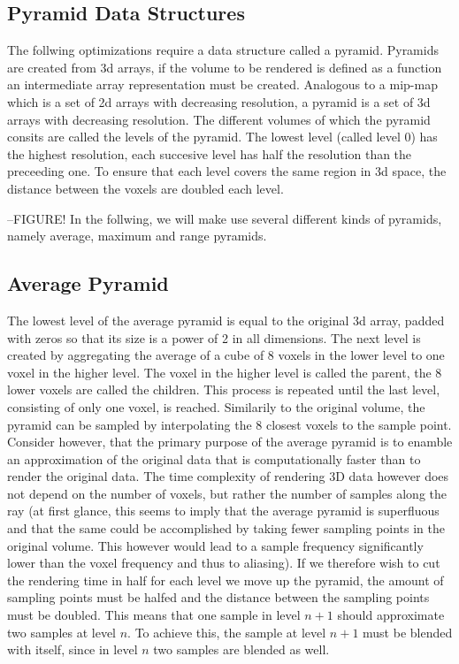 {\subsection{Pyramid Data Structures}
The follwing optimizations require a data structure called a pyramid. Pyramids are created from 3d arrays, if the volume to be rendered is defined as a function an intermediate array representation must be created.
Analogous to a mip-map which is a set of 2d arrays with decreasing resolution, a pyramid is a set of 3d arrays with decreasing resolution. The different volumes of which the pyramid consits are called the levels of the pyramid. The lowest level (called level 0) has the highest resolution, each succesive level has half the resolution than the preceeding one. To ensure that each level covers the same region in 3d space, the distance between the voxels are doubled each level.

--FIGURE!
In the follwing, we will make use several different kinds of pyramids, namely average, maximum and range pyramids.
\subsection{Average Pyramid}
The lowest level of the average pyramid is equal to the original 3d array, padded with zeros so that its size is a power of 2 in all dimensions.
The next level is created by aggregating the average of a cube of 8 voxels in the lower level to one voxel in the higher level. The voxel in the higher level is called the parent, the 8 lower voxels are called the children. This process is repeated until the last level, consisting of only one voxel, is reached. 
Similarily to the original volume, the pyramid can be sampled by interpolating the 8 closest voxels to the sample point. Consider however, that the primary purpose of the average pyramid is to enamble an approximation of the original data that is computationally faster than to render the original data.
The time complexity of rendering 3D data however does not depend on the number of voxels, but rather the number of samples along the ray (at first glance, this seems to imply that the average pyramid is superfluous and that the same could be accomplished by taking fewer sampling points in the original volume. This however would lead to a sample frequency significantly lower than the voxel frequency and thus to aliasing). If we therefore wish to cut the rendering time in half for each level we move up the pyramid, the amount of sampling points must be halfed and the distance between the sampling points must be doubled. This means that one sample in level $n+1$ should approximate two samples at level $n$. To achieve this, the sample at level $n+1$ must be blended with itself, since in level $n$ two samples are blended as well.


}
